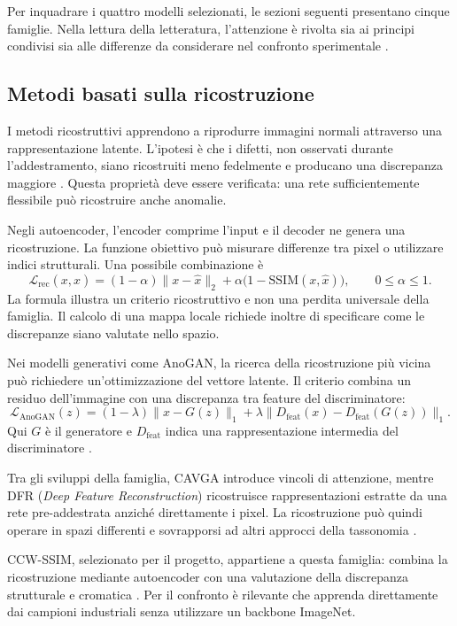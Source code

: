 Per inquadrare i quattro modelli selezionati, le sezioni seguenti presentano cinque famiglie. Nella lettura della letteratura, l'attenzione è rivolta sia ai principi condivisi sia alle differenze da considerare nel confronto sperimentale \cite{Cui_et_al._2023}.

\subsection{Metodi basati sulla ricostruzione}

I metodi ricostruttivi apprendono a riprodurre immagini normali attraverso una rappresentazione latente. L'ipotesi è che i difetti, non osservati durante l'addestramento, siano ricostruiti meno fedelmente e producano una discrepanza maggiore \cite{Yang_et_al._2021}. Questa proprietà deve essere verificata: una rete sufficientemente flessibile può ricostruire anche anomalie.

Negli autoencoder, l'encoder comprime l'input e il decoder ne genera una ricostruzione. La funzione obiettivo può misurare differenze tra pixel o utilizzare indici strutturali. Una possibile combinazione è
\[
    \mathcal{L}_{\mathrm{rec}}(x,\widehat{x}) =
    (1-\alpha)\lVert x-\widehat{x}\rVert_2
    +\alpha\bigl(1-\mathrm{SSIM}(x,\widehat{x})\bigr),
    \qquad 0\leq\alpha\leq1.
\]
La formula illustra un criterio ricostruttivo e non una perdita universale della famiglia. Il calcolo di una mappa locale richiede inoltre di specificare come le discrepanze siano valutate nello spazio.

Nei modelli generativi come AnoGAN, la ricerca della ricostruzione più vicina può richiedere un'ottimizzazione del vettore latente. Il criterio combina un residuo dell'immagine con una discrepanza tra feature del discriminatore:
\[
    \mathcal{L}_{\mathrm{AnoGAN}}(z)=
    (1-\lambda)\lVert x-G(z)\rVert_1
    +\lambda\lVert D_{\mathrm{feat}}(x)
    -D_{\mathrm{feat}}(G(z))\rVert_1.
\]
Qui $G$ è il generatore e $D_{\mathrm{feat}}$ indica una rappresentazione intermedia del discriminatore \cite{Schlegl_et_al._2017}.

Tra gli sviluppi della famiglia, CAVGA introduce vincoli di attenzione, mentre DFR (\textit{Deep Feature Reconstruction}) ricostruisce rappresentazioni estratte da una rete pre-addestrata anziché direttamente i pixel. La ricostruzione può quindi operare in spazi differenti e sovrapporsi ad altri approcci della tassonomia \cite{Cui_et_al._2023}.

CCW-SSIM, selezionato per il progetto, appartiene a questa famiglia: combina la ricostruzione mediante autoencoder con una valutazione della discrepanza strutturale e cromatica \cite{Berasi_2023}. Per il confronto è rilevante che apprenda direttamente dai campioni industriali senza utilizzare un backbone ImageNet.


